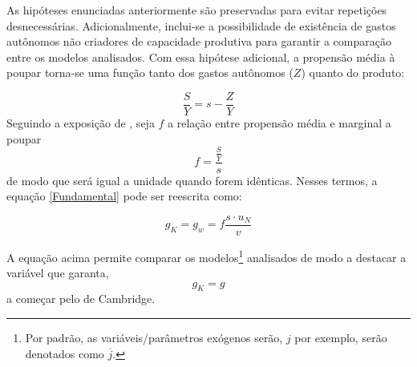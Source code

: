 As hipóteses enunciadas anteriormente são preservadas para evitar repetições desnecessárias. Adicionalmente, inclui-se a possibilidade de existência de gastos autônomos não criadores de capacidade produtiva para garantir a comparação entre os modelos analisados. Com essa hipótese adicional, a propensão média à poupar torna-se uma função tanto dos gastos autônomos ($Z$) quanto do produto:

\begin{equation}
\label{Poupanca_Super}
    \frac{S}{Y} = s - \frac{Z}{Y}
\end{equation}
Seguindo a exposição de \textcite{serrano_sraffian_1995}, seja $f$ a relação entre propensão média e marginal a poupar
$$
f = \frac{\frac{S}{Y}}{s}
$$
de modo que será igual a unidade quando forem idênticas. Nesses termos, a equação \ref{Fundamental} pode ser reescrita como:

\begin{equation}
 \label{EqGeral}   
g_K = g_w = f\frac{s\cdot u_N}{v}
\end{equation}

A equação acima permite comparar os modelos\footnote{Por padrão, as variáveis/parâmetros exógenos serão, $j$ por exemplo, serão denotados como $\overline j$.} analisados de modo a destacar a variável que garanta, 
$$
g_K = g
$$
a começar pelo de Cambridge.
